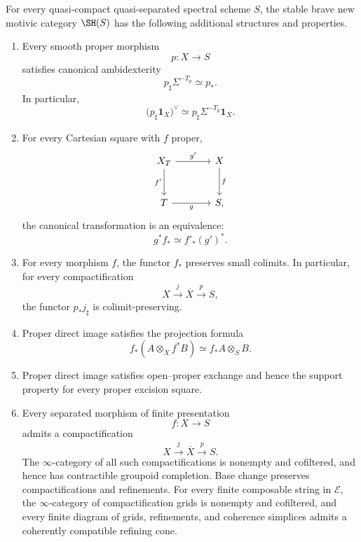 \begin{theorem}
\label{thm:proper-geometric-package}
For every quasi-compact quasi-separated spectral scheme \(S\), the stable
brave new motivic category \(\SH(S)\) has the following additional structures
and properties.
\begin{enumerate}
    \item Every smooth proper morphism
    \[
        p:X\longrightarrow S
    \]
    satisfies canonical ambidexterity
    \[
        p_\sharp\Sigma^{-T_p}
        \simeq
        p_*.
    \]
    In particular,
    \[
        \bigl(p_\sharp\mathbf1_X\bigr)^\vee
        \simeq
        p_\sharp\Sigma^{-T_p}\mathbf1_X.
    \]

    \item For every Cartesian square with \(f\) proper,
    \[
    \begin{tikzcd}[column sep=large,row sep=large]
        X_T \arrow[r,"g'"] \arrow[d,"f'"']
            & X \arrow[d,"f"] \\
        T \arrow[r,"g"'] & S,
    \end{tikzcd}
    \]
    the canonical transformation is an equivalence:
    \[
        g^*f_*
        \simeq
        f'_*(g')^*.
    \]

    \item For every morphism \(f\), the functor \(f_*\) preserves small
    colimits.  In particular, for every compactification
    \[
        X\xrightarrow{j}\overline X\xrightarrow{p}S,
    \]
    the functor \(p_*j_\sharp\) is colimit-preserving.

    \item Proper direct image satisfies the projection formula
    \[
        f_*(A\otimes_Xf^*B)
        \simeq
        f_*A\otimes_SB.
    \]

    \item Proper direct image satisfies open--proper exchange and hence the
    support property for every proper excision square.

    \item Every separated morphism of finite presentation
    \[
        f:X\longrightarrow S
    \]
    admits a compactification
    \[
        X\xrightarrow{j}\overline X\xrightarrow{p}S.
    \]
    The \(\infty\)-category of all such compactifications is nonempty and
    cofiltered, and hence has contractible groupoid completion.  Base change
    preserves compactifications and refinements.  For every finite composable
    string in \(\mathcal E\), the \(\infty\)-category of compactification
    grids is nonempty and cofiltered, and every finite diagram of grids,
    refinements, and coherence simplices admits a coherently compatible
    refining cone.
\end{enumerate}
\end{theorem}

